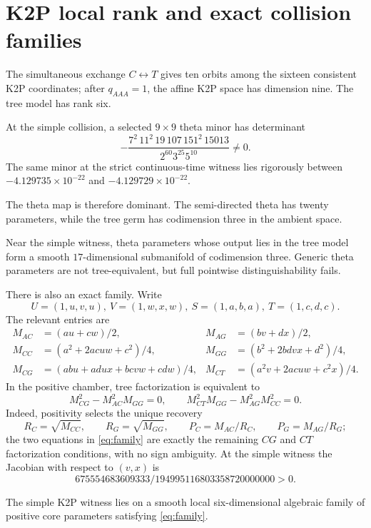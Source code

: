 \documentclass[11pt]{article}
\theoremstyle{remark}\newtheorem{remark}[theorem]{Remark}
\begin{document}
\section{K2P local rank and exact collision families}\label{sec:k2p-rank}
The simultaneous exchange $C\leftrightarrow T$ gives ten orbits among the sixteen consistent K2P coordinates; after $q_{AAA}=1$, the affine K2P space has dimension nine. The tree model has rank six.
\begin{proposition}\label{prop:k2p-rank}
At the simple collision, a selected $9\times9$ theta minor has determinant
\begin{equation}\label{eq:k2p-det}-\frac{7^2\,11^2\,19\,107\,151^2\,15013}{2^{60}3^{25}5^{10}}\ne0.\end{equation}
The same minor at the strict continuous-time witness lies rigorously between $-4.129735\times10^{-22}$ and $-4.129729\times10^{-22}$.
\end{proposition}
The theta map is therefore dominant. The semi-directed theta has twenty parameters, while the tree germ has codimension three in the ambient space.
\begin{corollary}\label{cor:k2p-geometry}
Near the simple witness, theta parameters whose output lies in the tree model form a smooth $17$-dimensional submanifold of codimension three. Generic theta parameters are not tree-equivalent, but full pointwise distinguishability fails.
\end{corollary}

There is also an exact family. Write
\[
U=(1,u,v,u),\ V=(1,w,x,w),\ S=(1,a,b,a),\ T=(1,c,d,c).
\]
The relevant entries are
\begin{align*}
M_{AC}&=(au+cw)/2,&M_{AG}&=(bv+dx)/2,\\
M_{CC}&=(a^2+2acuw+c^2)/4,&M_{GG}&=(b^2+2bdvx+d^2)/4,\\
M_{CG}&=(abu+adux+bcvw+cdw)/4,&M_{CT}&=(a^2v+2acuw+c^2x)/4.
\end{align*}
In the positive chamber, tree factorization is equivalent to
\begin{equation}\label{eq:family}M_{CG}^2-M_{AC}^2M_{GG}=0,\qquad M_{CT}^2M_{GG}-M_{AG}^2M_{CC}^2=0.\end{equation}
Indeed, positivity selects the unique recovery
\[
R_C=\sqrt{M_{CC}},\qquad R_G=\sqrt{M_{GG}},\qquad
P_C=M_{AC}/R_C,\qquad P_G=M_{AG}/R_G;
\]
the two equations in \eqref{eq:family} are exactly the remaining $CG$ and $CT$ factorization conditions, with no sign ambiguity.
At the simple witness the Jacobian with respect to $(v,x)$ is
\[
675554683609333/194995116803358720000000>0.
\]
\begin{corollary}\label{cor:k2p-family}
The simple K2P witness lies on a smooth local six-dimensional algebraic family of positive core parameters satisfying \eqref{eq:family}.
\end{corollary}
\end{document}

